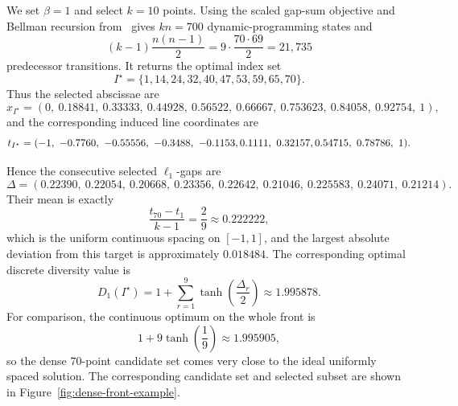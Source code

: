 \documentclass[12pt,a4paper]{article}
\begin{document}
We set $\beta=1$ and select $k=10$ points.  Using the scaled gap-sum objective and Bellman recursion from~\cite{Emmerich2026PolynomialTime} gives $kn=700$ dynamic-programming states and
\[
 (k-1)\frac{n(n-1)}{2}=9\cdot\frac{70\cdot 69}{2}=21{,}735
\]
predecessor transitions.  It returns the optimal index set
\[
 I^\star=\{1,14,24,32,40,47,53,59,65,70\}.
\]
Thus the selected abscissae are
\[
 x_{I^\star}=(0,\ 0.18841,\ 0.33333,\ 0.44928,\ 0.56522,\ 0.66667,\ 0.753623,\ 0.84058,\ 0.92754,\ 1),
\]
and the corresponding induced line coordinates are
\[
 t_{I^\star}=(-1,\ -0.7760,\ -0.55556,\ -0.3488,\ -0.1153,  0.1111,\ 0.32157,\\ 0.54715,\ 0.78786,\ 1).
\]

Hence the consecutive selected $\ell_1$-gaps are
\[
 \Delta=(0.22390,\ 0.22054,\ 0.20668,\ 0.23356,\ 0.22642,\ 0.21046,\ 0.225583,\ 0.24071,\ 0.21214).
\]
Their mean is exactly
\[
 \frac{t_{70}-t_1}{k-1}=\frac{2}{9}\approx 0.222222,
\]
which is the uniform continuous spacing on $[-1,1]$, and the largest absolute deviation from this target is approximately $0.018484$.  The corresponding optimal discrete diversity value is
\[
 D_1(I^\star)=1+\sum_{r=1}^{9}\tanh\!\left(\frac{\Delta_r}{2}\right)\approx 1.995878.
\]
For comparison, the continuous optimum on the whole front is
\[
 1+9\tanh\!\left(\frac{1}{9}\right)\approx 1.995905,
\]
so the dense $70$-point candidate set comes very close to the ideal uniformly spaced solution.  The corresponding candidate set and selected subset are shown in Figure~\ref{fig:dense-front-example}.
\end{document}
